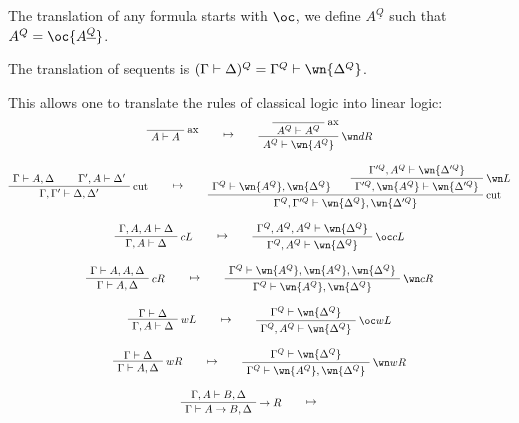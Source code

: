 The translation of any formula starts with \(\oc\), we define
\(A^{\underline{Q}}\) such that \(A^Q=\oc{A^{\underline{Q}}}\).

The translation of sequents is
\((\Gamma\vdash\Delta)^Q = \Gamma^Q\vdash\wn{\Delta^Q}\).

This allows one to translate the rules of classical logic into linear logic:
\begin{gather*}
\LabelRule{\rulename{ax}}
\NulRule{A\vdash A}
\DisplayProof
\qquad\mapsto\qquad
\LabelRule{\rulename{ax}}
\NulRule{A^Q\vdash A^Q}
\LabelRule{\wn d R}
\UnaRule{A^Q\vdash \wn{A^Q}}
\DisplayProof
\\[2ex]
\AxRule{\Gamma\vdash A,\Delta}
\AxRule{\Gamma',A\vdash \Delta'}
\LabelRule{\rulename{cut}}
\BinRule{\Gamma,\Gamma'\vdash \Delta,\Delta'}
\DisplayProof
\qquad\mapsto\qquad
\AxRule{\Gamma^Q\vdash \wn{A^Q},\wn{\Delta^Q}}
\AxRule{\Gamma'^Q,A^Q\vdash \wn{\Delta'^Q}}
\LabelRule{\wn L}
\UnaRule{\Gamma'^Q,\wn{A^Q}\vdash \wn{\Delta'^Q}}
\LabelRule{\rulename{cut}}
\BinRule{\Gamma^Q,\Gamma'^Q\vdash \wn{\Delta^Q},\wn{\Delta'^Q}}
\DisplayProof
\\[2ex]
\AxRule{\Gamma,A,A\vdash \Delta}
\LabelRule{c L}
\UnaRule{\Gamma,A\vdash \Delta}
\DisplayProof
\qquad\mapsto\qquad
\AxRule{\Gamma^Q,A^Q,A^Q\vdash \wn{\Delta^Q}}
\LabelRule{\oc c L}
\UnaRule{\Gamma^Q,A^Q\vdash \wn{\Delta^Q}}
\DisplayProof
\\[2ex]
\AxRule{\Gamma\vdash A,A,\Delta}
\LabelRule{c R}
\UnaRule{\Gamma\vdash A,\Delta}
\DisplayProof
\qquad\mapsto\qquad
\AxRule{\Gamma^Q\vdash \wn{A^Q},\wn{A^Q},\wn{\Delta^Q}}
\LabelRule{\wn c R}
\UnaRule{\Gamma^Q\vdash \wn{A^Q},\wn{\Delta^Q}}
\DisplayProof
\\[2ex]
\AxRule{\Gamma\vdash \Delta}
\LabelRule{w L}
\UnaRule{\Gamma,A\vdash \Delta}
\DisplayProof
\qquad\mapsto\qquad
\AxRule{\Gamma^Q\vdash \wn{\Delta^Q}}
\LabelRule{\oc w L}
\UnaRule{\Gamma^Q,A^Q\vdash \wn{\Delta^Q}}
\DisplayProof
\\[2ex]
\AxRule{\Gamma\vdash \Delta}
\LabelRule{w R}
\UnaRule{\Gamma\vdash A,\Delta}
\DisplayProof
\qquad\mapsto\qquad
\AxRule{\Gamma^Q\vdash \wn{\Delta^Q}}
\LabelRule{\wn w R}
\UnaRule{\Gamma^Q\vdash \wn{A^Q},\wn{\Delta^Q}}
\DisplayProof
\\[2ex]
\AxRule{\Gamma,A\vdash B,\Delta}
\LabelRule{\imp R}
\UnaRule{\Gamma\vdash A\imp B,\Delta}
\DisplayProof
\qquad\mapsto\qquad
\AxRule{\Gamma^Q,A^Q\vdash \wn{B^Q},\wn{\Delta^Q}}
\LabelRule{\limp R}
\UnaRule{\Gamma^Q\vdash A^Q\limp \wn{B^Q},\wn{\Delta^Q}}
\LabelRule{\oc R}
\UnaRule{\Gamma^Q\vdash \oc{(A^Q\limp \wn{B^Q})},\wn{\Delta^Q}}

\end{gather*}
